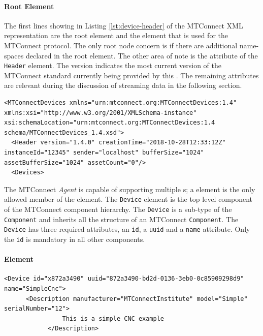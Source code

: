 \paragraph{ Root Element}

The first lines showing in Listing \ref{lst:device-header} of the MTConnect XML representation are the root element  and the  element that is used for the MTConnect protocol. The only root node concern is if there are additional name-spaces declared in the root  element. The other area of note is the  attribute of the \texttt{Header} element.  The version indicates the most current version of the MTConnect standard currently being provided by this . The remaining attributes are relevant during the discussion of streaming data in the following section.

\begin{lstlisting}[caption={Device Header},label={lst:device-header}]
<MTConnectDevices xmlns="urn:mtconnect.org:MTConnectDevices:1.4" xmlns:xsi="http://www.w3.org/2001/XMLSchema-instance" xsi:schemaLocation="urn:mtconnect.org:MTConnectDevices:1.4 schema/MTConnectDevices_1.4.xsd">
  <Header version="1.4.0" creationTime="2018-10-28T12:33:12Z" instanceId="12345" sender="localhost" bufferSize="1024" assetBufferSize="1024" assetCount="0"/>
  <Devices>
\end{lstlisting}

The MTConnect \textit{Agent} is capable of supporting multiple s; a  element is the only allowed member of the  element. The \texttt{Device} element is the top level component of the MTConnect component hierarchy. The \texttt{Device} is a sub-type of the \texttt{Component} and inherits all the structure of an MTConnect \texttt{Component}. The \texttt{Device} has three required attributes, an \texttt{id}, a \texttt{uuid} and a \texttt{name} attribute. Only the \texttt{id} is mandatory in all other components. 

\paragraph{ Element}


\begin{lstlisting}[firstnumber=last,%
    caption={\texttt{Device} Element Mapping},label={lst:device-model-device}]
    <Device id="x872a3490" uuid="872a3490-bd2d-0136-3eb0-0c85909298d9" name="SimpleCnc">
      <Description manufacturer="MTConnectInstitute" model="Simple" serialNumber="12">
				This is a simple CNC example
			</Description>
\end{lstlisting}

